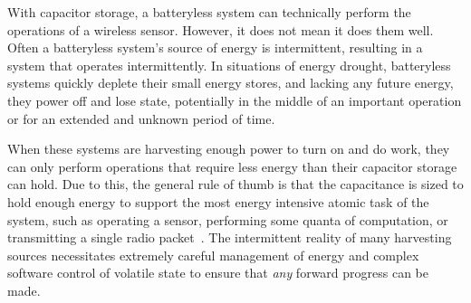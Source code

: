 With capacitor storage,
a batteryless system can technically perform the operations of a wireless sensor. However, it does not mean it does them well.
Often a batteryless system's source of energy is intermittent, resulting in a system that operates intermittently.
In situations of energy drought, batteryless systems quickly deplete their
small energy stores, and lacking any future energy,
they power off and lose
state, potentially in the middle of an important operation or for an extended and unknown period of time.

When these systems are harvesting enough power to turn on and do work, they can only perform operations that require less energy than their capacitor storage can hold. Due to this, the general rule of thumb is that the capacitance is sized to hold enough energy to support the most energy intensive atomic task of the system, such as operating a sensor, performing some quanta of computation, or transmitting a single radio packet~\cite{nardello2019camaroptera,colinReconfigurable18, shukla2019skinnypower, hesterFlicker17}.
The intermittent reality of many harvesting sources necessitates extremely careful management of energy and complex software control of volatile state to ensure that \textit{any} forward progress can be made.

